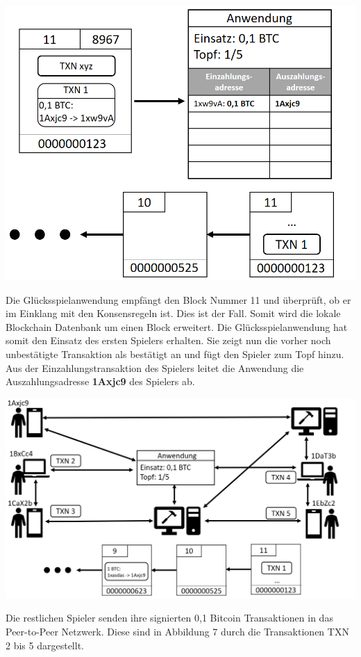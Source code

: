 \vspace{1cm}
\begin{minipage}{0.55\textwidth}
\includegraphics[width=\textwidth]{Figures/konzept_btc/konzept6}
\centering
\decoRule
{}
\label{fig:konzept6}
\end{minipage}
\begin{minipage}{0.45\textwidth}
Die Glücksspielanwendung empfängt den Block Nummer 11 und überprüft, ob er im Einklang mit den Konsensregeln ist. Dies ist der Fall. Somit wird die lokale Blockchain Datenbank um einen Block erweitert. Die Glücksspielanwendung hat somit den Einsatz des ersten Spielers erhalten. Sie zeigt nun die vorher noch unbestätigte Transaktion als bestätigt an und fügt den Spieler zum Topf hinzu. Aus der Einzahlungstransaktion des Spielers leitet die Anwendung die Auszahlungsadresse \textbf{1Axjc9} des Spielers ab. 
\end{minipage}

\vspace{1cm}
\begin{minipage}{0.55\textwidth}
\includegraphics[width=\textwidth]{Figures/konzept_btc/konzept7}
\centering
\decoRule
{}
\label{fig:konzept7}
\end{minipage}
\begin{minipage}{0.45\textwidth}
Die restlichen Spieler senden ihre signierten 0,1 Bitcoin Transaktionen in das Peer-to-Peer Netzwerk. Diese sind in Abbildung 7 durch die Transaktionen TXN 2 bis 5 dargestellt.
\end{minipage}

